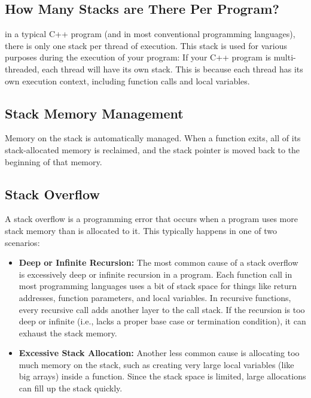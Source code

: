 \documentclass{report}
\begin{document}
\begin{concept}
    \bigbreak \noindent 
    \subsection{How Many Stacks are There Per Program?}
    \bigbreak \noindent 
    in a typical C++ program (and in most conventional programming languages), there is only one stack per thread of execution. This stack is used for various purposes during the execution of your program:
    \bigbreak \noindent 
    If your C++ program is multi-threaded, each thread will have its own stack. This is because each thread has its own execution context, including function calls and local variables.

    \pagebreak 
    \subsection{Stack Memory Management}
    \bigbreak \noindent 
    Memory on the stack is automatically managed. When a function exits, all of its stack-allocated memory is reclaimed, and the stack pointer is moved back to the beginning of that memory.

    \subsection{Stack Overflow}
    \bigbreak \noindent 
    \begin{concept}
        A stack overflow is a programming error that occurs when a program uses more stack memory than is allocated to it. This typically happens in one of two scenarios:
        \begin{itemize}
            \item \textbf{Deep or Infinite Recursion:} The most common cause of a stack overflow is excessively deep or infinite recursion in a program. Each function call in most programming languages uses a bit of stack space for things like return addresses, function parameters, and local variables. In recursive functions, every recursive call adds another layer to the call stack. If the recursion is too deep or infinite (i.e., lacks a proper base case or termination condition), it can exhaust the stack memory.
            \item \textbf{Excessive Stack Allocation:} Another less common cause is allocating too much memory on the stack, such as creating very large local variables (like big arrays) inside a function. Since the stack space is limited, large allocations can fill up the stack quickly.
        \end{itemize}
    \end{concept}


\end{concept}
\end{document}
